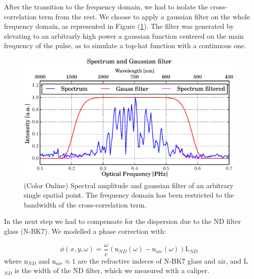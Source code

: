 \documentclass[12pt,a4paper,twoside]{article}
\begin{document}
After the transition to the frequency domain, we had to isolate the cross-correlation term from the rest.
We choose to apply a gaussian filter on the whole frequency domain, as represented in Figure (\ref{fig_filter}).
The filter was generated by elevating to an arbitrarly high power a gaussian function centered on the main frequency of the pulse, as to simulate a top-hat function with a continuous one.

\begin{figure}
	\centering
	\includegraphics[scale=0.9]{data/filter}
	\caption{(Color Online) Spectral amplitude and gaussian filter of an arbitrary single spatial point. The frequency domain has been restricted to the bandwidth of the cross-correlation term.}
	\label{fig_filter}
\end{figure}

In the next step we had to compensate for the dispersion due to the ND filter glass (N-BK7).
We modelled a phase correction with:

\begin{equation}
	\phi(x,y,\omega) = \frac{\omega}{c}\left( \mathrm{n}_{ND}(\omega) - \mathrm{n}_{air}(\omega)\right)\mathrm{L}_{ND}
\end{equation}
where $\mathrm{n}_{ND}$ and $\mathrm{n}_{air} \approx 1$ are the refractive indeces of N-BK7 glass and air, and L$_{ND}$ is the width of the ND filter, which we measured with a caliper.
\end{document}
